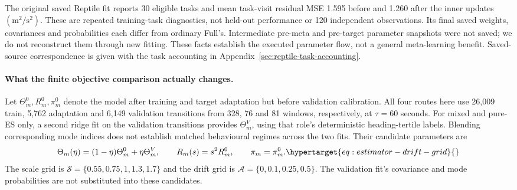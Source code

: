 The original saved Reptile fit reports 30 eligible tasks and mean
task-visit residual MSE 1.595 before and 1.260 after the inner updates
\((\mathrm{m}^2/\mathrm{s}^2)\). These are repeated training-task diagnostics,
not held-out performance or 120 independent observations. Its final saved
weights, covariances and probabilities each differ from ordinary Full's.
Intermediate pre-meta and pre-target parameter snapshots were not saved;
we do not reconstruct them through new fitting. These facts establish the
executed parameter flow, not a general meta-learning benefit. Saved-source
correspondence is given with the task accounting in
Appendix~\ref{sec:reptile-task-accounting}.

\paragraph{What the finite objective comparison actually changes.}
\label{sec:estimator-calibration}\hypertarget{sec:estimator-calibration}{}
Let \(\Theta_m^0,R_m^0,\pi_m^0\) denote the model after training and target
adaptation but before validation calibration. All four routes here use
26,009 train, 5,762 adaptation and 6,149 validation transitions from
328, 76 and 81 windows, respectively, at \(\tau=60\) seconds.
For mixed and pure-ES only, a second ridge fit on the validation transitions
provides \(\Theta_m^V\), using that role's deterministic heading-tertile
labels. Blending corresponding mode indices does not establish matched
behavioural regimes across the two fits. Their candidate parameters are
\begin{equation}
\Theta_m(\eta)=(1-\eta)\Theta_m^0+\eta\Theta_m^V,\qquad
R_m(s)=s^2R_m^0,\qquad \pi_m=\pi_m^0 .
\label{eq:estimator-drift-grid}\hypertarget{eq:estimator-drift-grid}{}
\end{equation}
The scale grid is \(\mathcal S=\{0.55,0.75,1,1.3,1.7\}\) and the drift
grid is \(\mathcal A=\{0,0.1,0.25,0.5\}\). The validation fit's covariance
and mode probabilities are not substituted into these candidates.

